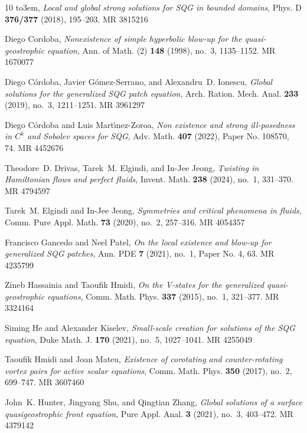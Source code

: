 \documentclass[10pt]{amsart}
\providecommand{\bysame}{\leavevmode\hbox to3em{\hrulefill}\thinspace}
\providecommand{\MR}{\relax\ifhmode\unskip\space\fi MR }
\providecommand{\bysame}{\leavevmode\hbox to3em{\hrulefill}\thinspace}
\providecommand{\MR}{\relax\ifhmode\unskip\space\fi MR }
\theoremstyle{definition}
\theoremstyle{remark}
\numberwithin{equation}{section}
\newcommand{\0}{\emptyset}
\begin{document}
\begin{thebibliography}{10}
			\bysame, \emph{Local and global strong solutions for {SQG} in bounded domains},
			Phys. D \textbf{376/377} (2018), 195--203. \MR{3815216}
			
			Diego Cordoba, \emph{Nonexistence of simple hyperbolic blow-up for the
				quasi-geostrophic equation}, Ann. of Math. (2) \textbf{148} (1998), no.~3,
			1135--1152. \MR{1670077}
			
			Diego C\'{o}rdoba, Javier G\'{o}mez-Serrano, and Alexandru~D. Ionescu,
			\emph{Global solutions for the generalized {SQG} patch equation}, Arch.
			Ration. Mech. Anal. \textbf{233} (2019), no.~3, 1211--1251. \MR{3961297}
			
			Diego C\'{o}rdoba and Luis Mart\'{\i}nez-Zoroa, \emph{Non existence and strong
				ill-posedness in {$C^k$} and {S}obolev spaces for {SQG}}, Adv. Math.
			\textbf{407} (2022), Paper No. 108570, 74. \MR{4452676}
			
			Theodore~D. Drivas, Tarek~M. Elgindi, and In-Jee Jeong, \emph{Twisting in
				{H}amiltonian flows and perfect fluids}, Invent. Math. \textbf{238} (2024),
			no.~1, 331--370. \MR{4794597}
			
			Tarek~M. Elgindi and In-Jee Jeong, \emph{Symmetries and critical phenomena in
				fluids}, Comm. Pure Appl. Math. \textbf{73} (2020), no.~2, 257--316.
			\MR{4054357}
			
			Francisco Gancedo and Neel Patel, \emph{On the local existence and blow-up for
				generalized {SQG} patches}, Ann. PDE \textbf{7} (2021), no.~1, Paper No. 4,
			63. \MR{4235799}
			
			Zineb Hassainia and Taoufik Hmidi, \emph{On the {V}-states for the generalized
				quasi-geostrophic equations}, Comm. Math. Phys. \textbf{337} (2015), no.~1,
			321--377. \MR{3324164}
			
			Siming He and Alexander Kiselev, \emph{Small-scale creation for solutions of
				the {SQG} equation}, Duke Math. J. \textbf{170} (2021), no.~5, 1027--1041.
			\MR{4255049}
			
			Taoufik Hmidi and Joan Mateu, \emph{Existence of corotating and
				counter-rotating vortex pairs for active scalar equations}, Comm. Math. Phys.
			\textbf{350} (2017), no.~2, 699--747. \MR{3607460}
			
			John~K. Hunter, Jingyang Shu, and Qingtian Zhang, \emph{Global solutions of a
				surface quasigeostrophic front equation}, Pure Appl. Anal. \textbf{3} (2021),
			no.~3, 403--472. \MR{4379142}
			

\end{thebibliography}
\end{document}
